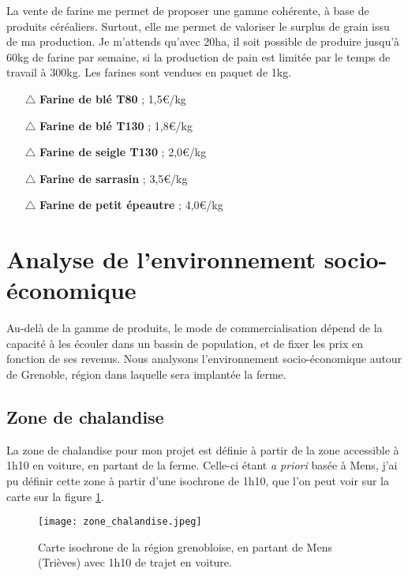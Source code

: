 \documentclass{book}
\begin{document}
La vente de farine me permet de proposer une gamme cohérente, à base de produits céréaliers. Surtout, elle me permet de valoriser le surplus de grain issu de ma production. Je m'attends qu'avec 20ha, il soit possible de produire jusqu'à 60kg de farine par semaine, si la production de pain est limitée par le temps de travail à 300kg. Les farines sont vendues en paquet de 1kg.
\begin{itemize}

	\item[$\triangle$] \textbf{Farine de blé T80}  ; 1,5\euro{}/kg
	\item[$\triangle$] \textbf{Farine de blé T130} ; 1,8\euro{}/kg
	\item[$\triangle$] \textbf{Farine de seigle T130} ; 2,0\euro{}/kg
	\item[$\triangle$] \textbf{Farine de sarrasin} ; 3,5\euro{}/kg
	\item[$\triangle$] \textbf{Farine de petit épeautre} ; 4,0\euro{}/kg

\end{itemize}

\section{Analyse de l'environnement socio-économique}

Au-delà de la gamme de produits, le mode de commercialisation dépend de la capacité à les écouler dans un bassin de population, et de fixer les prix en fonction de ses revenus. Nous analysons l'environnement socio-économique autour de Grenoble, région dans laquelle sera implantée la ferme.

\subsection{Zone de chalandise}

La zone de chalandise pour mon projet est définie à partir de la zone accessible à 1h10 en voiture, en partant de la ferme. Celle-ci étant \textit{a priori} basée à Mens, j’ai pu définir cette zone à partir d’une isochrone de 1h10, que l’on peut voir sur la carte sur la figure \ref{fig:chalandise}. 

\begin{figure}[h!]
\begin{center}
	\texttt{[image: zone\_chalandise.jpeg]}
	\caption{Carte isochrone de la région grenobloise, en partant de Mens (Trièves) avec 1h10 de trajet en voiture.}
	\label{fig:chalandise}
\end{center}
\end{figure}
\end{document}
